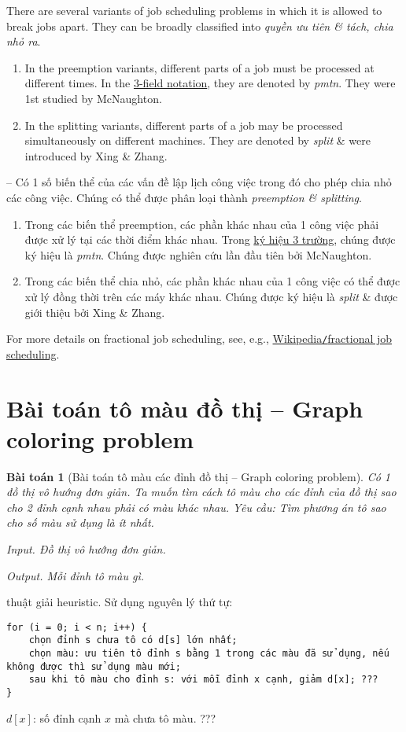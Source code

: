 \documentclass{article}
\newtheorem{baitoan}{Bài toán}
\begin{document}
There are several variants of job scheduling problems in which it is allowed to break jobs apart. They can be broadly classified into {\it quyền ưu tiên \& tách, chia nhỏ ra}.
\begin{enumerate}
	\item In the preemption variants, different parts of a job must be processed at different times. In the \href{https://en.wikipedia.org/wiki/Optimal_job_scheduling}{3-field notation}, they are denoted by {\it pmtn}. They were 1st studied by {\sc McNaughton}.
	\item In the splitting variants, different parts of a job may be processed simultaneously on different machines. They are denoted by {\it split} \& were introduced by {\sc Xing \& Zhang}.
\end{enumerate}
-- Có 1 số biến thể của các vấn đề lập lịch công việc trong đó cho phép chia nhỏ các công việc. Chúng có thể được phân loại thành {\it preemption \& splitting}.
\begin{enumerate}
	\item Trong các biến thể preemption, các phần khác nhau của 1 công việc phải được xử lý tại các thời điểm khác nhau. Trong \href{https://en.wikipedia.org/wiki/Optimal_job_scheduling}{ký hiệu 3 trường}, chúng được ký hiệu là {\it pmtn}. Chúng được nghiên cứu lần đầu tiên bởi {\sc McNaughton}.
	\item Trong các biến thể chia nhỏ, các phần khác nhau của 1 công việc có thể được xử lý đồng thời trên các máy khác nhau. Chúng được ký hiệu là {\it split} \& được giới thiệu bởi {\sc Xing \& Zhang}.
\end{enumerate}
For more details on fractional job scheduling, see, e.g., \href{https://en.wikipedia.org/wiki/Fractional_job_scheduling}{Wikipedia{\tt/}fractional job scheduling}.


\section{Bài toán tô màu đồ thị -- Graph coloring problem}

\begin{baitoan}[Bài toán tô màu các đỉnh đồ thị -- Graph coloring problem]
	Có 1 đồ thị vô hướng đơn giản. Ta muốn tìm cách tô màu cho các đỉnh của đồ thị sao cho 2 đỉnh cạnh nhau phải có màu khác nhau. Yêu cầu: Tìm phương án tô sao cho số màu sử dụng là ít nhất.
	\item {\sf Input.} Đồ thị vô hướng đơn giản.
	\item {\sf Output.} Mỗi đỉnh tô màu gì.
\end{baitoan}
{ thuật giải heuristic.} Sử dụng nguyên lý thứ tự:
\begin{verbatim}
for (i = 0; i < n; i++) {
    chọn đỉnh s chưa tô có d[s] lớn nhất;
    chọn màu: ưu tiên tô đỉnh s bằng 1 trong các màu đã sử dụng, nếu không được thì sử dụng màu mới;
    sau khi tô màu cho đỉnh s: với mỗi đỉnh x cạnh, giảm d[x]; ???
}
\end{verbatim}
$d[x]$: số đỉnh cạnh $x$ mà chưa tô màu. ???
\end{document}
